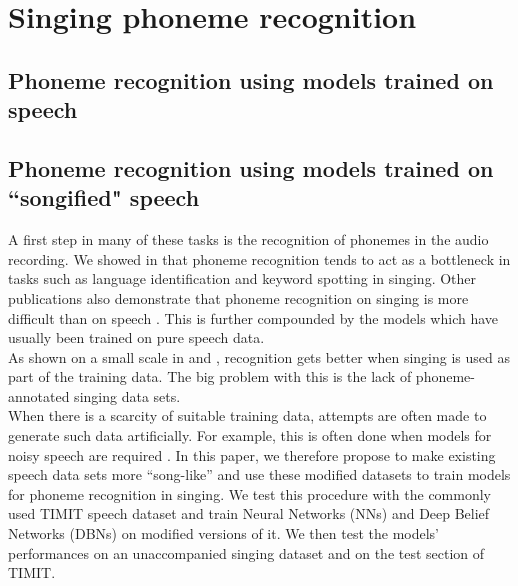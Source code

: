 \chapter{Singing phoneme recognition} \label{chap:phonerec}
\section{Phoneme recognition using models trained on speech}


\section{Phoneme recognition using models trained on ``songified" speech}

A first step in many of these tasks is the recognition of phonemes in the audio recording. We showed in \cite{kruspe_kws1} that phoneme recognition tends to act as a bottleneck in tasks such as language identification and keyword spotting in singing. Other publications also demonstrate that phoneme recognition on singing is more difficult than on speech\cite{mesaros1} \cite{jens} \cite{loscos}. This is further compounded by the models which have usually been trained on pure speech data.\\
As shown on a small scale in \cite{jens} and \cite{kruspe_kws1}, recognition gets better when singing is used as part of the training data. The big problem with this is the lack of phoneme-annotated singing data sets.\\
When there is a scarcity of suitable training data, attempts are often made to generate such data artificially. For example, this is often done when models for noisy speech are required \cite{ntimit}\cite{aurora}. In this paper, we therefore propose to make existing speech data sets more ``song-like'' and use these modified datasets to train models for phoneme recognition in singing. We test this procedure with the commonly used TIMIT speech dataset \cite{timit} and train Neural Networks (NNs) and Deep Belief Networks (DBNs) on modified versions of it. We then test the models' performances on an unaccompanied singing dataset and on the test section of TIMIT.\\

